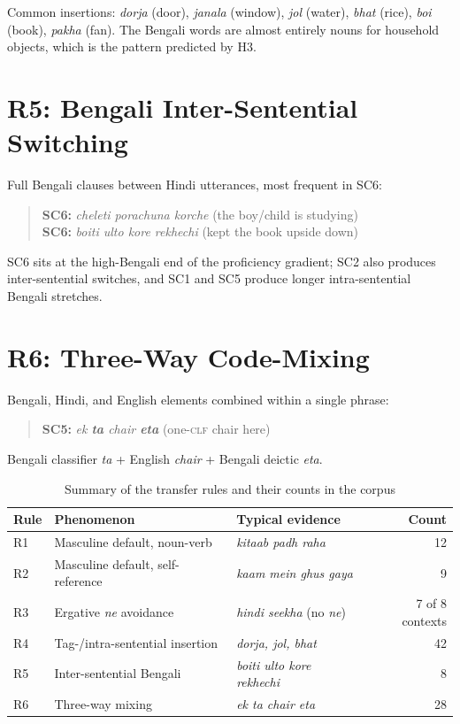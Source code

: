 \documentclass[11pt,a4paper]{report}
\begin{document}
Common insertions: \textit{dorja} (door), \textit{janala} (window), \textit{jol} (water), \textit{bhat} (rice), \textit{boi} (book), \textit{pakha} (fan). The Bengali words are almost entirely nouns for household objects, which is the pattern predicted by H3.

\section{R5: Bengali Inter-Sentential Switching}

Full Bengali clauses between Hindi utterances, most frequent in SC6:

\begin{quote}
  \textbf{SC6:} \textit{cheleti porachuna korche} (the boy/child is studying)\\
  \textbf{SC6:} \textit{boiti ulto kore rekhechi} (kept the book upside down)
\end{quote}

SC6 sits at the high-Bengali end of the proficiency gradient; SC2 also produces inter-sentential switches, and SC1 and SC5 produce longer intra-sentential Bengali stretches.

\section{R6: Three-Way Code-Mixing}

Bengali, Hindi, and English elements combined within a single phrase:

\begin{quote}
  \textbf{SC5:} \textit{ek \textbf{ta} chair \textbf{eta}} (one-\textsc{clf} chair here)
\end{quote}

Bengali classifier \textit{ta} + English \textit{chair} + Bengali deictic \textit{eta}.

\begin{table}[H]
\centering
\caption{Summary of the transfer rules and their counts in the corpus}
\label{tab:rulesummary}
\small
\begin{tabular}{llp{4cm}r}
\toprule
\textbf{Rule} & \textbf{Phenomenon} & \textbf{Typical evidence} & \textbf{Count} \\
\midrule
R1 & Masculine default, noun-verb & \textit{kitaab padh raha} & 12 \\
R2 & Masculine default, self-reference & \textit{kaam mein ghus gaya} & 9 \\
R3 & Ergative \textit{ne} avoidance & \textit{hindi seekha} (no \textit{ne}) & 7 of 8 contexts \\
R4 & Tag-/intra-sentential insertion & \textit{dorja, jol, bhat} & 42 \\
R5 & Inter-sentential Bengali & \textit{boiti ulto kore rekhechi} & 8 \\
R6 & Three-way mixing & \textit{ek ta chair eta} & 28 \\
\bottomrule
\end{tabular}
\end{table}
\end{document}
